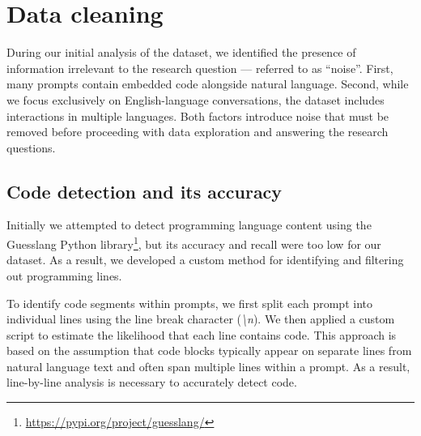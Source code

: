 \section{Data cleaning}
During our initial analysis of the dataset, we identified the presence of information irrelevant to the research question --- referred to as ``noise''. First, many prompts contain embedded code alongside natural language. Second, while we focus exclusively on English-language conversations, the dataset includes interactions in multiple languages. Both factors introduce noise that must be removed before proceeding with data exploration and answering the research questions.

\subsection{Code detection and its accuracy}\label{sec:prog-identification}
Initially we attempted to detect programming language content using the Guesslang Python library\footnote{\url{https://pypi.org/project/guesslang/}}, but its accuracy and recall were too low for our dataset. As a result, we developed a custom method for identifying and filtering out programming lines.

To identify code segments within prompts, we first split each prompt into individual lines using the line break character (\textit{\textbackslash n}). We then applied a custom script to estimate the likelihood that each line contains code. This approach is based on the assumption that code blocks typically appear on separate lines from natural language text and often span multiple lines within a prompt. As a result, line-by-line analysis is necessary to accurately detect code.

